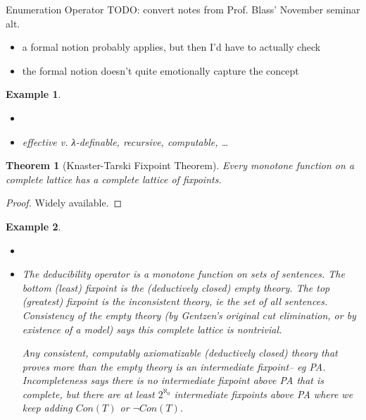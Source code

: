 \documentclass[
	fontsize=10pt, %
	twoside=false, %
	secnumdepth=-1, %
]{kaobook}
\theoremstyle{break}
\newtheorem*{thm}{Theorem} %
\newtheorem*{Eg}{Example} %
\begin{document}
    \See Enumeration Operator
    TODO: convert notes from Prof. Blass' November seminar
    alt.
    \begin{itemize}
        \item a formal notion probably applies, but then I'd have to actually check
        \item the formal notion doesn't quite emotionally capture the concept
    \end{itemize}
    \begin{Eg}
        \begin{itemize}
            \item[]
            \item effective v. λ-definable, recursive, computable, …
        \end{itemize}
    \end{Eg}
    \begin{thm}[Knaster-Tarski Fixpoint Theorem]
        Every monotone function on a complete lattice has a complete lattice of fixpoints.
    \end{thm}
    \begin{proof}
        Widely available.
    \end{proof}
    \begin{Eg}
        \begin{itemize}
            \item[]
            \item The deducibility operator is a monotone function on sets of sentences.
                The bottom (least) fixpoint is the (deductively closed) empty theory.
                The top (greatest) fixpoint is the inconsistent theory, ie the set of all sentences.
                Consistency of the empty theory
                (by Gentzen's original cut elimination, or by existence of a model)
                says this complete lattice is nontrivial.

                Any consistent, computably axiomatizable (deductively closed) theory that proves more than the empty theory
                is an intermediate fixpoint-- eg PA.
                Incompleteness says there is no intermediate fixpoint above PA that is complete,
                but there are at least $2^{ℵ_0}$ intermediate fixpoints above PA where we keep adding $Con(T)$ or $¬Con(T)$.
        \end{itemize}
    \end{Eg}
\end{document}
